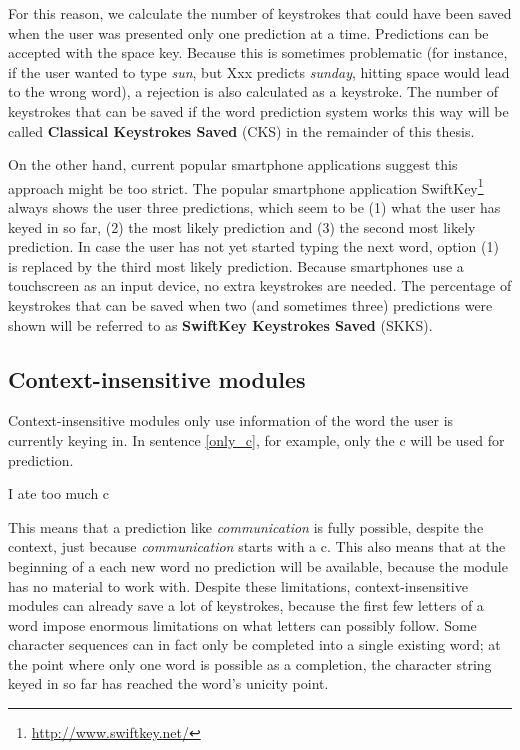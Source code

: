 \documentclass[11pt]{article}
\begin{document}
For this reason, we calculate the number of keystrokes that could have been saved when the user was presented only one prediction at a time. Predictions can be accepted with the space key. Because this is sometimes problematic (for instance, if the user wanted to type \emph{sun}, but Xxx predicts \emph{sunday}, hitting space would lead to the wrong word), a rejection is also calculated as a keystroke. The number of keystrokes that can be saved if the word prediction system works this way will be called \textbf{Classical Keystrokes Saved} (CKS) in the remainder of this thesis.

On the other hand, current popular smartphone applications suggest this approach might be too strict. The popular smartphone application SwiftKey\footnote{\url{http://www.swiftkey.net/}} always shows the user three predictions, which seem to be (1) what the user has keyed in so far, (2) the most likely prediction and (3) the second most likely prediction. In case the user has not yet started typing the next word, option (1) is replaced by the third most likely prediction. Because smartphones use a touchscreen as an input device, no extra keystrokes are needed. The percentage of keystrokes that can be saved when two (and sometimes three) predictions were shown will be referred to as \textbf{SwiftKey Keystrokes Saved} (SKKS).

\subsection{Context-insensitive modules} \label{ci}

Context-insensitive modules only use information of the word the user is currently keying in. In sentence \ref{only_c}, for example, only the c will be used for prediction. 

\begin{examples}
\item I ate too much c \label{only_c}
\end{examples}

This means that a prediction like \emph{communication} is fully possible, despite the context, just because \emph{communication} starts with a c. This also means that at the beginning of a each new word no prediction will be available, because the module has no material to work with. Despite these limitations, context-insensitive modules can already save a lot of keystrokes, because the first few letters of a word impose enormous limitations on what letters can possibly follow. Some character sequences can in fact only be completed into a single existing word; at the point where only one word is possible as a completion, the character string keyed in so far has reached the word's unicity point.
\end{document}
